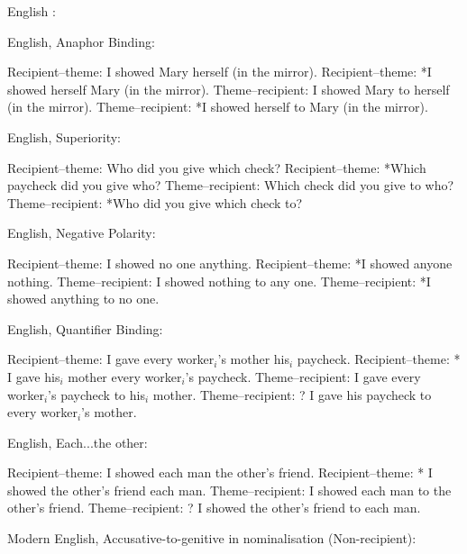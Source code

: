 \begin{exe}
\begin{xlist}
	\end{xlist}
	English \citep[ex 10]{Hallman.2015}:
	\begin{xlist}
	\end{xlist}
	 English, Anaphor Binding:
		\begin{xlist}
			\ex Recipient--theme: I showed Mary herself (in the mirror).
			\ex Recipient--theme: *I showed herself Mary (in the mirror).
			\ex Theme--recipient: I showed Mary to herself (in the mirror).
			\ex Theme--recipient: *I showed herself to Mary (in the mirror).
		\end{xlist}
	 English, Superiority:
		\begin{xlist}
			\ex Recipient--theme: Who did you give which check?
			\ex Recipient--theme: *Which paycheck did you give who?
			\ex Theme--recipient: Which check did you give to who?
			\ex Theme--recipient: *Who did you give which check to?
		\end{xlist}
	 English, Negative Polarity:
		\begin{xlist}
			\ex Recipient--theme: I showed no one anything.
			\ex Recipient--theme: *I showed anyone nothing.
			\ex Theme--recipient: I showed nothing to any one.
			\ex Theme--recipient: *I showed anything to no one.
		\end{xlist}
	 English, Quantifier Binding:
		\begin{xlist}
			\ex Recipient--theme: I gave every worker$_i$'s mother his$_i$ paycheck.
			\ex Recipient--theme: * I gave his$_i$ mother every worker$_i$'s paycheck.
			\ex Theme--recipient: I gave every worker$_i$'s paycheck to his$_i$ mother.
			\ex Theme--recipient: ? I gave his paycheck to every worker$_i$'s mother.
		\end{xlist}
	 English, Each...the other:
		\begin{xlist}
			\ex Recipient--theme: I showed each man the other's friend.
			\ex Recipient--theme: * I showed the other's friend each man.
			\ex Theme--recipient: I showed each man to the other's friend.
			\ex Theme--recipient: ? I showed the other's friend to each man.
		\end{xlist}
	 Modern English, Accusative-to-genitive in nominalisation (Non-recipient):
		\begin{xlist}

\end{xlist}
\end{exe}
